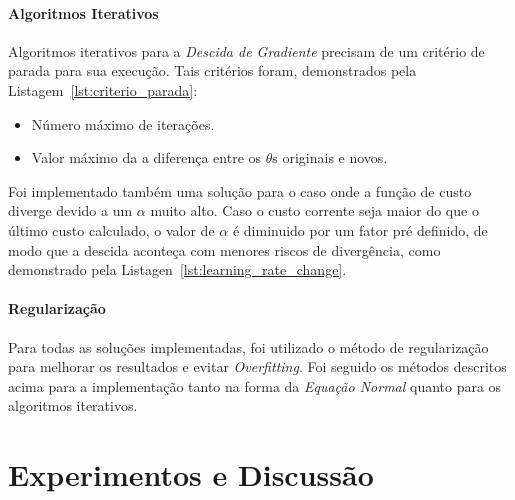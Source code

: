 \documentclass[conference]{IEEEtran}
\newenvironment{filecode}[1][]
{\minipage{0.9\linewidth}%
	\lstset{basicstyle=\ttfamily\footnotesize,frame=single,float=ht,#1}}
{\endminipage}%
\begin{document}
\paragraph{Algoritmos Iterativos}

Algoritmos iterativos para a \textit{Descida de Gradiente} precisam de um critério de parada para sua execução. Tais critérios foram, demonstrados pela Listagem~\ref{lst:criterio_parada}:

\begin{itemize}
  \item Número máximo de iterações.
  \item Valor máximo da a diferença entre os $\theta$s originais e novos.
\end{itemize}

\begin{filecode}[label=lst:criterio_parada,caption=Criterios de Parada para os algoritmos de Descida do Gradiente]
  \lstset{numbers=left}
	
\end{filecode}

Foi implementado também uma solução para o caso onde a função de custo diverge devido a um $\alpha$ muito alto. Caso o custo corrente seja maior do que o último custo calculado, o valor de $\alpha$ é diminuido por um fator pré definido, de modo que a descida aconteça com menores riscos de divergência, como demonstrado pela Listagen~\ref{lst:learning_rate_change}.

\begin{filecode}[label=lst:learning_rate_change,caption=Modo como o fator $\alpha$ é modificado]
  \lstset{numbers=left}
	
\end{filecode}

\paragraph{Regularização}

Para todas as soluções implementadas, foi utilizado o método de regularização para melhorar os resultados e evitar \textit{Overfitting}. Foi seguido os métodos descritos acima para a implementação tanto na forma da \textit{Equação Normal} quanto para os algoritmos iterativos.

\section{Experimentos e Discussão}
\end{document}
